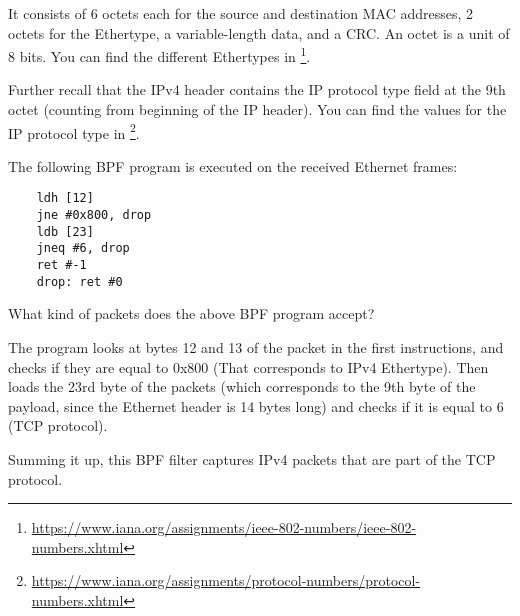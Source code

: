 \documentclass[11pt, a4paper, addpoints, answers]{exam}
\begin{document}
\begin{questions}
\begin{parts}
It consists of 6 octets each for the source and destination MAC addresses,
2 octets for the Ethertype, a variable-length data, and a CRC. An octet is a
unit of 8 bits. You can find the different Ethertypes in
\footnote{\url{https://www.iana.org/assignments/ieee-802-numbers/ieee-802-numbers.xhtml}}.

Further recall that the IPv4 header contains the IP protocol type field at
the 9th octet (counting from beginning of the IP header). You can find the
values for the IP protocol type in
\footnote{\url{https://www.iana.org/assignments/protocol-numbers/protocol-numbers.xhtml}}.

The following BPF program is executed on the received Ethernet frames:

\begin{verbatim}
	ldh [12]
	jne #0x800, drop
	ldb [23]
	jneq #6, drop
	ret #-1
	drop: ret #0
\end{verbatim}

What kind of packets does the above BPF program accept?
    
    \begin{solution}
		The program looks at bytes 12 and 13 of the packet in the first instructions, and checks if they are equal to 0x800 (That corresponds to IPv4 Ethertype).
		Then loads the 23rd byte of the packets (which corresponds to the 9th byte of the payload, since the Ethernet header is 14 bytes long) and checks if it is equal to 6 (TCP protocol).
		
		Summing it up, this BPF filter captures IPv4 packets that are part of the TCP protocol.
    \end{solution}

\end{parts}

\end{questions}
\end{document}
